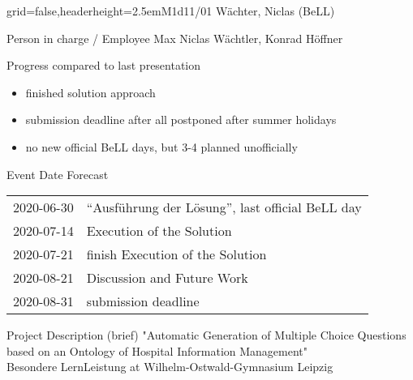\documentclass[english]{kiesgrube}
\begin{document}
\newpage

\begin{poster}{grid=false,headerheight=2.5em}{}{M1d11/01 Wächter, Niclas (BeLL)}{}{}
\begin{posterbox}[name=person,column=0,row=0]{Person in charge / Employee}
Max Niclas Wächtler, Konrad Höffner
\end{posterbox}
\begin{posterbox}[name=progress,below=person]{Progress compared to last presentation}
\begin{itemize}
\item finished solution approach
\item submission deadline after all postponed after summer holidays
\item no new official BeLL days, but 3-4 planned unofficially
\end{itemize}
\end{posterbox}
\begin{posterbox}[name=event,below=progress]{Event Date Forecast}
\begin{tabulary}{\textwidth}{lL}
2020-06-30	&\enquote{Ausführung der Lösung}, last official BeLL day\\
2020-07-14	&Execution of the Solution\\
2020-07-21	&finish Execution of the Solution\\
2020-08-21	&Discussion and Future Work\\
2020-08-31	&submission deadline\\
\end{tabulary}
\end{posterbox}
\begin{posterbox}[name=description,column=1,row=0]{Project Description (brief)}
\small
"Automatic Generation of Multiple Choice Questions based on an Ontology of Hospital Information Management"\\
Besondere LernLeistung at Wilhelm-Ostwald-Gymnasium Leipzig
\end{posterbox}

\end{poster}
\end{document}
